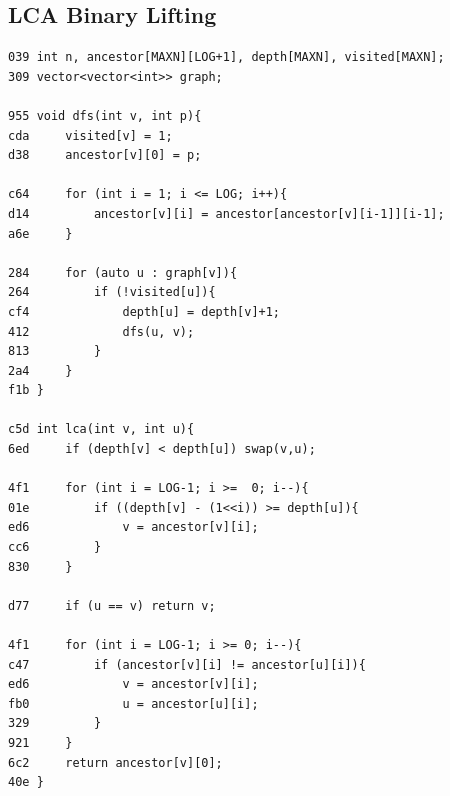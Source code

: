 \documentclass[11pt, a4paper, twoside]{article}
\begin{document}
{\subsection{LCA Binary Lifting}
\begin{lstlisting}
039 int n, ancestor[MAXN][LOG+1], depth[MAXN], visited[MAXN];
309 vector<vector<int>> graph;

955 void dfs(int v, int p){
cda     visited[v] = 1;
d38     ancestor[v][0] = p;
    
c64     for (int i = 1; i <= LOG; i++){
d14         ancestor[v][i] = ancestor[ancestor[v][i-1]][i-1];
a6e     }
    
284     for (auto u : graph[v]){
264         if (!visited[u]){
cf4             depth[u] = depth[v]+1;
412             dfs(u, v);
813         }
2a4     }
f1b }

c5d int lca(int v, int u){
6ed     if (depth[v] < depth[u]) swap(v,u);
    
4f1     for (int i = LOG-1; i >=  0; i--){
01e         if ((depth[v] - (1<<i)) >= depth[u]){
ed6             v = ancestor[v][i];
cc6         } 
830     }
    
d77     if (u == v) return v;
    
4f1     for (int i = LOG-1; i >= 0; i--){
c47         if (ancestor[v][i] != ancestor[u][i]){
ed6             v = ancestor[v][i];
fb0             u = ancestor[u][i];
329         }
921     }
6c2     return ancestor[v][0];
40e }


\end{lstlisting}}
\end{document}
